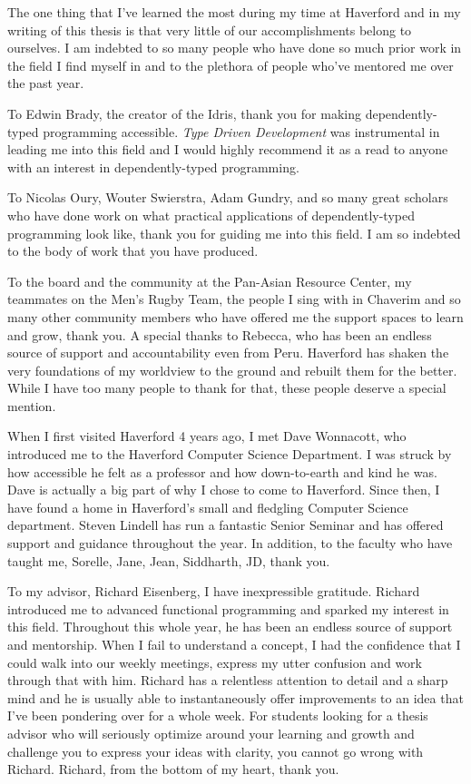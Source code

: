 
\cleardoublepage


\begin{acknowledgements}

The one thing that I've learned the most during my time at Haverford and in my
writing of this thesis is that very little of our accomplishments belong to
ourselves. I am indebted to so many people who have done so much prior work in
the field I find myself in and to the plethora of people who've mentored me over
the past year. 

To Edwin Brady, the creator of the Idris, thank you for making dependently-typed
programming accessible. \textit{Type Driven Development} was instrumental in
leading me into this field and I would highly recommend it as a read to anyone
with an interest in dependently-typed programming. 

To Nicolas Oury, Wouter Swierstra, Adam Gundry, and so many great scholars
who have done work on what practical applications of dependently-typed
programming look like, thank you for guiding me into this field. I am so
indebted to the body of work that you have produced. 

To the board and the community at the Pan-Asian Resource Center, my teammates on
the Men's Rugby Team, the people I sing with in Chaverim and so many other
community members who have offered me the support spaces to learn and grow,
thank you. A special thanks to Rebecca, who has been an endless source of
support and accountability even from Peru. Haverford has shaken the very
foundations of my worldview to the ground and rebuilt them for the better. While
I have too many people to thank for that, these people deserve a special
mention. 

When I first visited Haverford 4 years ago, I met Dave Wonnacott, who introduced
me to the Haverford Computer Science Department. I was struck by how accessible
he felt as a professor and how down-to-earth and kind he was. Dave is actually a
big part of why I chose to come to Haverford. Since then, I have found a home in
Haverford's small and fledgling Computer Science department. Steven Lindell has
run a fantastic Senior Seminar and has offered support and guidance throughout
the year. In addition, to the faculty who have taught me, Sorelle, Jane, Jean,
Siddharth, JD, thank you. 

To my advisor, Richard Eisenberg, I have inexpressible gratitude. Richard
introduced me to advanced functional programming and sparked my interest in this
field. Throughout this whole year, he has been an endless source of support and
mentorship. When I fail to understand a concept, I had the confidence that I
could walk into our weekly meetings, express my utter confusion and work through
that with him. Richard has a relentless attention to detail and a sharp mind and
he is usually able to instantaneously offer improvements to an idea that I've
been pondering over for a whole week. For students looking for a thesis advisor
who will seriously optimize around your learning and growth and challenge you to
express your ideas with clarity, you cannot go wrong with Richard. Richard, from
the bottom of my heart, thank you. 


\end{acknowledgements}
